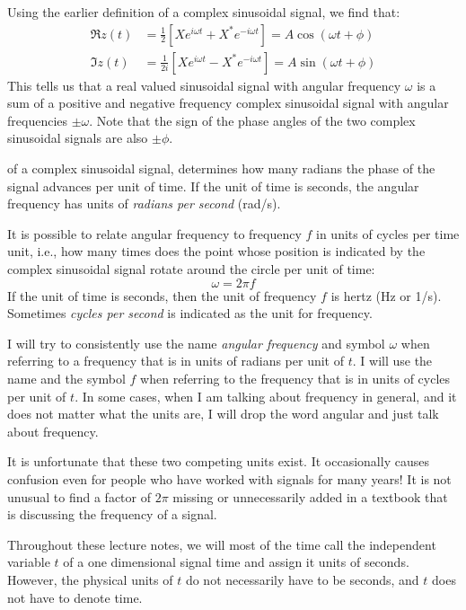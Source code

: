 Using the earlier definition of a complex sinusoidal signal, we find that:
\begin{align}
\Re{z(t)} &= \frac{1}{2}\left[X e^{i\omega t} + X^* e^{-i\omega t}\right] = A\cos(\omega t + \phi) \label{eq:resignal} \\
\Im{z(t)} &= \frac{1}{2i}\left[X e^{i\omega t} - X^* e^{-i\omega t}\right] = A\sin(\omega t + \phi) \label{eq:imsignal}
\end{align}
This tells us that a real valued sinusoidal signal with angular frequency $\omega$ is a sum of a positive and negative frequency complex sinusoidal signal with angular frequencies $\pm\omega$. Note that the sign of the phase angles of the two complex sinusoidal signals are also $\pm\phi$.

 of a complex sinusoidal signal, determines how many radians the phase of the signal advances per unit of time. If the unit of time is seconds, the angular frequency has units of \emph{radians per second} (rad/s).

It is possible to relate angular frequency to frequency $f$ in units of cycles per time unit, i.e., how many times does the point whose position is indicated by the complex sinusoidal signal rotate around the circle per unit of time:
\begin{equation}
\boxed{\omega = 2\pi f}
\end{equation}
If the unit of time is seconds, then the unit of frequency $f$ is hertz (Hz or 1/s). Sometimes \emph{cycles per second} is indicated as the unit for frequency. 

I will try to consistently use the name \emph{angular frequency} and symbol $\omega$ when referring to a frequency that is in units of radians per unit of $t$. I will use the name \emph{} and the symbol $f$ when referring to the frequency that is in units of cycles
per unit of $t$. In some cases, when I am talking about frequency in general, and it does not matter what the units are, I will drop the word angular and just talk about frequency.

It is unfortunate that these two competing units exist. 
It occasionally causes confusion even for people who have worked with signals for many years! 
It is not unusual to find a factor of $2\pi$ missing or unnecessarily added in a textbook that is discussing the frequency of a signal.

Throughout these lecture notes, we will most of the time call the independent variable $t$ of a one dimensional signal time and assign it units of seconds. 
However, the physical units of $t$ do not necessarily have to be seconds, and $t$ does not have to denote time.


